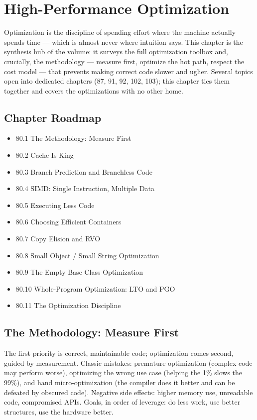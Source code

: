 \chapter{High-Performance Optimization}

Optimization is the discipline of spending effort where the machine actually spends time --- which is almost never where intuition says. This chapter is the synthesis hub of the volume: it surveys the full optimization toolbox and, crucially, the methodology --- measure first, optimize the hot path, respect the cost model --- that prevents making correct code slower and uglier. Several topics open into dedicated chapters (87, 91, 92, 102, 103); this chapter ties them together and covers the optimizations with no other home.

\section*{Chapter Roadmap}
\begin{itemize}
\item 80.1 The Methodology: Measure First
\item 80.2 Cache Is King
\item 80.3 Branch Prediction and Branchless Code
\item 80.4 SIMD: Single Instruction, Multiple Data
\item 80.5 Executing Less Code
\item 80.6 Choosing Efficient Containers
\item 80.7 Copy Elision and RVO
\item 80.8 Small Object / Small String Optimization
\item 80.9 The Empty Base Class Optimization
\item 80.10 Whole-Program Optimization: LTO and PGO
\item 80.11 The Optimization Discipline
\end{itemize}

\section{The Methodology: Measure First}
The first priority is correct, maintainable code; optimization comes second, guided by measurement. Classic mistakes: premature optimization (complex code may perform worse), optimizing the wrong use case (helping the 1\% slows the 99\%), and hand micro-optimization (the compiler does it better and can be defeated by obscured code). Negative side effects: higher memory use, unreadable code, compromised APIs. Goals, in order of leverage: do less work, use better structures, use the hardware better.

